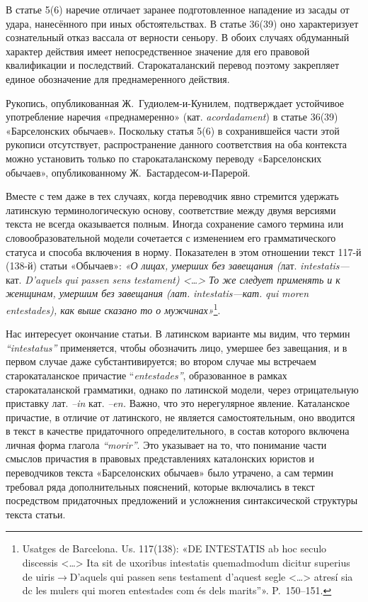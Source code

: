В статье 5(6) наречие отличает заранее подготовленное нападение из засады от удара, нанесённого при иных обстоятельствах. В статье 36(39) оно характеризует сознательный отказ вассала от верности сеньору. В обоих случаях обдуманный характер действия имеет непосредственное значение для его правовой квалификации и последствий. Старокаталанский перевод поэтому закрепляет единое обозначение для преднамеренного действия.

Рукопись, опубликованная Ж.~Гудиолем-и-Кунилем, подтверждает устойчивое употребление наречия «преднамеренно» (кат. \emph{acordadament}) в статье 36(39) «Барселонских обычаев». Поскольку статья 5(6) в сохранившейся части этой рукописи отсутствует, распространение данного соответствия на оба контекста можно установить только по старокаталанскому переводу «Барселонских обычаев», опубликованному Ж.~Бастардесом-и-Парерой.

Вместе с тем даже в тех случаях, когда переводчик явно стремится удержать латинскую терминологическую основу, соответствие между двумя версиями текста не всегда оказывается полным. Иногда сохранение самого термина или словообразовательной модели сочетается с изменением его грамматического статуса и способа включения в норму. Показателен в этом отношении текст 117-й (138-й) статьи «Обычаев»:\emph{ «О лицах, умерших без завещания (}лат. \emph{intestatis}\emph{---}кат. \emph{D}\emph{’}\emph{aquels}\emph{ }\emph{qui}\emph{ }\emph{passen}\emph{ }\emph{sens}\emph{ }\emph{testament}\emph{) <…> То же следует применять и к женщинам, умершим без завещания (лат. }\emph{intestatis}\emph{---кат. }\emph{qui}\emph{ }\emph{moren}\emph{ }\emph{entestades}\emph{), как выше сказано то о мужчинах»}\footnote{Usatges de Barcelona. Us. 117(138): «DE INTESTATIS ab hoc seculo discessis <…> Ita sit de uxoribus intestatis quemadmodum dicitur superius de uiris$\rightarrow$D’aquels qui passen sens testament d’aquest segle <…> atresí sia dc les mulers qui moren entestades com és dels marits”». P.~150--151.}.

Нас интересует окончание статьи. В латинском варианте мы видим, что термин \emph{“}\emph{intestat}\emph{us}\emph{”} применяется, чтобы обозначить лицо, умершее без завещания, и в первом случае даже субстантивируется; во втором случае мы встречаем старокаталанское причастие “\emph{entestades}\emph{”}, образованное в рамках старокаталанской грамматики, однако по латинской модели, через отрицательную приставку лат. \emph{--in} кат. \emph{--}\emph{en}\emph{.} Важно, что это нерегулярное явление. Каталанское причастие, в отличие от латинского, не является самостоятельным, оно вводится в текст в качестве придаточного определительного, в состав которого включена личная форма глагола \emph{“}\emph{morir}\emph{”}. Это указывает на то, что понимание части смыслов причастия в правовых представлениях каталонских юристов и переводчиков текста «Барселонских обычаев» было утрачено, а сам термин требовал ряда дополнительных пояснений, которые включались в текст посредством придаточных предложений и усложнения синтаксической структуры текста статьи.


